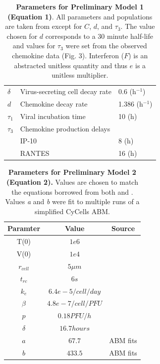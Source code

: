 \documentclass[preprint,10pt,authoryear]{elsarticle}
\begin{document}
\begin{table}[!ht]
\begin{center}
\begin{tabular}{|  l  l  l  |}
  $\delta$ & Virus-secreting cell decay rate & 0.6 (h$^{-1}$) \\
  $d$ & Chemokine decay rate & 1.386 (h$^{-1}$) \\
  $\tau_1$ & Viral incubation time & 10 (h) \\
  $\tau_3$ & Chemokine production delays & \\
    & \hspace{2em} IP-10 & 8 (h)\\
    & \hspace{2em} RANTES & 16 (h)\\
  \hline
\end{tabular}
\caption{\textbf{Parameters for Preliminary Model 1 (Equation 1)}.  All parameters and populations are taken from \citep{Mitchell2011} except for $C$, $d$, and $\tau_3$.  The value chosen for $d$ corresponds to a 30 minute half-life and values for $\tau_3$ were set from the observed chemokine data (Fig. 3).  Interferon ($F$) is an abstracted unitless quantity and thus $e$ is a unitless multiplier.}
\label{tab:dde}
\end{center}
\end{table}


\begin{table}[!ht]
\begin{center}
\begin{tabular}{ | c | c | c | }
  \hline                        
  Paramter & Value & Source \\
  \hline
  T(0) & $1e6$ & \citep{Mitchell2011} \\
  V(0) &  $1e4$ & \citep{Mitchell2011} \\
  $r_{cell}$ &  $5 \mu m$ & \citep{Miao2010a} \\
  $t_{rc}$ & $6s$ & \citep{Peters1983} \\
  $k_e$ & $6.4e-5/cell/day$ & \citep{Miao2010a} \\
  $\beta$ & $4.8e-7/cell/PFU$ & \citep{Mitchell2011} \\
  $p$ & $0.18 PFU/h$ & \citep{Mitchell2011} \\
  $\delta$ & $16.7 hours$ & \citep{Mitchell2011} \\
  $a$ & $67.7$ & ABM fits \\
  $b$ & $433.5$ & ABM fits \\
  \hline  
\end{tabular}
\caption{\textbf{Parameters for Preliminary Model 2 (Equation 2).}  Values are chosen to match the equations borrowed from both \citep{Mitchell2011} and \citep{Miao2010a}.  Values \textit{a} and \textit{b} were fit to multiple runs of a simplified CyCells ABM.}
\label{tab:supplement}
\end{center}
\end{table}
\end{document}
